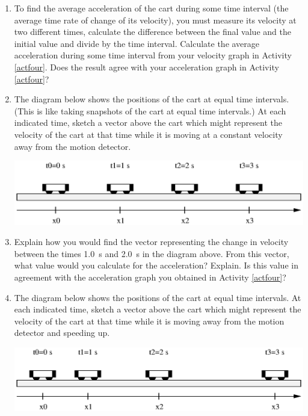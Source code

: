 \begin{enumerate}

\item To find the average acceleration of the cart during some time interval (the
average time rate of change of its velocity), you must measure its velocity
at two different times, calculate the difference between the final value and
the initial value and divide by the time interval.
Calculate the average acceleration during some time interval from your velocity graph in Activity \ref{actfour}.  
Does the result agree with your acceleration graph in Activity \ref{actfour}?
\vspace{20mm}

\item The diagram below shows the positions of the cart at equal time intervals.
(This is like taking snapshots of the cart at equal time intervals.) At each
indicated time, sketch a vector above the cart which might represent the velocity
of the cart at that time while it is moving at a constant velocity away from
the motion detector.

\vspace{0.3cm}
{\par\centering \includegraphics{iqsRelatingMotion/changing_fig3.eps} \par}
\vspace{0.3cm}

\item Explain how you would find the vector representing the change in velocity
between the times 1.0~s and 2.0~s in the diagram above. From this vector, what
value would you calculate for the acceleration? Explain. Is this value in agreement
with the acceleration graph you obtained in Activity \ref{actfour}?
\vspace{20mm}


\item  The diagram below shows the positions of the cart at equal time intervals.
At each indicated time, sketch a vector above the cart which might represent
the velocity of the cart at that time while it is moving away from the motion
detector and speeding up.

\vspace{0.3cm}
{\par\centering \includegraphics{iqsRelatingMotion/changing_fig4.eps} \par}
\vspace{0.3cm}


\end{enumerate}
